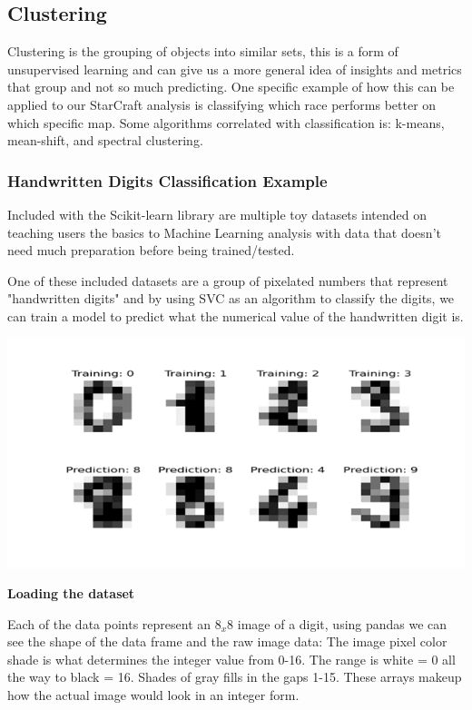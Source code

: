 \documentclass[a4paper,12pt]{report}
\newcommand{\msection}[1]{\noindent\textbf{#1}}
\begin{document}
\subsection{Clustering}
Clustering is the grouping of objects into similar sets, this is a form of unsupervised learning and can give us a more general idea of insights and metrics that group and not so much predicting. One specific example of how this can be applied to our StarCraft analysis is classifying which race performs better on which specific map. Some algorithms correlated with classification is: k-means, mean-shift, and spectral clustering.

\subsubsection{Handwritten Digits Classification Example}

Included with the Scikit-learn library are multiple toy datasets intended on teaching users the basics to Machine Learning analysis with data that doesn’t need much preparation before being trained/tested.

One of these included datasets are a group of pixelated numbers that represent "handwritten digits" and by using SVC as an algorithm to classify the digits, we can train a model to predict what the numerical value of the handwritten digit is.

\begin{center}
    \captionsetup{type=figure}
    \includegraphics[width=.9\linewidth]{media/digit.png}
\end{center}

\msection{Loading the dataset}

Each of the data points represent an $8_x8$ image of a digit, using pandas we can see the shape of the data frame and the raw image data:
The image pixel color shade is what determines the integer value from 0-16. The range is white = 0 all the way to black = 16. Shades of gray fills in the gaps 1-15. These arrays makeup how the actual image would look in an integer form.	
\end{document}
